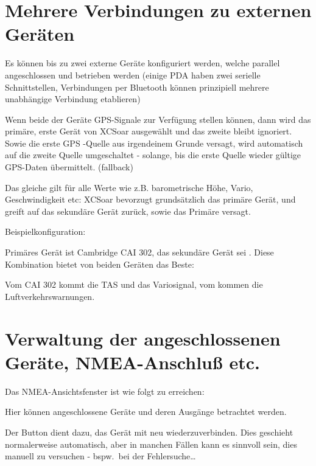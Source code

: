\section{Mehrere Verbindungen zu externen Geräten}

Es können bis zu zwei externe Geräte konfiguriert werden, welche parallel angeschlossen und betrieben werden (einige \textsf{PDA} haben zwei serielle Schnittstellen, Verbindungen per Bluetooth können prinzipiell mehrere unabhängige Verbindung etablieren)

Wenn  beide der Geräte GPS-Signale zur Verfügung stellen können, dann wird das primäre, erste Gerät von \textsf{XCSoar} ausgewählt und das zweite bleibt ignoriert. Sowie die erste GPS -Quelle aus irgendeinem Grunde versagt, wird automatisch auf die zweite Quelle umgeschaltet - solange, bis die erste Quelle wieder gültige GPS-Daten übermittelt. (fallback)

Das gleiche gilt für alle Werte wie z.B. barometrische Höhe, Vario, Geschwindigkeit etc:
\textsf{XCSoar} bevorzugt grundsätzlich das primäre Gerät, und greift auf das sekundäre Gerät zurück, sowie das Primäre versagt.

Beispielkonfiguration:

Primäres Gerät ist Cambridge CAI 302, das sekundäre Gerät sei \fl . Diese Kombination bietet von beiden Geräten das Beste:

Vom CAI 302 kommt die TAS und das Variosignal, vom \fl kommen die  Luftverkehrswarnungen.
\section{Verwaltung der angeschlossenen Geräte, NMEA-Anschluß etc.\ }

Das NMEA-Ansichtsfenster ist wie folgt zu erreichen:

 Hier können angeschlossene Geräte und  deren Ausgänge  betrachtet werden.

Der Button  dient dazu, das Gerät mit \xc neu wiederzuverbinden. Dies geschieht normalerweise automatisch, aber in manchen Fällen kann es sinnvoll sein, dies manuell zu versuchen - bspw.\ bei der Fehlersuche\dots

